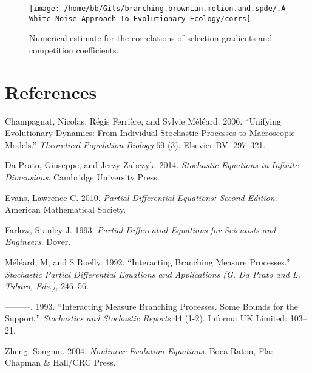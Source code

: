 \documentclass[]{article}
\begin{document}
\begin{figure}[H]

{\centering \texttt{[image: /home/bb/Gits/branching.brownian.motion.and.spde/.A White Noise Approach To Evolutionary Ecology/corrs]} 

}

\caption{\label{num_corr} Numerical estimate for the correlations of selection gradients and competition coefficients.}\label{fig:unnamed-chunk-1}
\end{figure}

\hypertarget{references}{%
\section*{References}\label{references}}

\hypertarget{refs}{}
\leavevmode\hypertarget{ref-Champagnat2006}{}%
Champagnat, Nicolas, Régis Ferrière, and Sylvie Méléard. 2006.
``Unifying Evolutionary Dynamics: From Individual Stochastic Processes
to Macroscopic Models.'' \emph{Theoretical Population Biology} 69 (3).
Elsevier BV: 297--321.

\leavevmode\hypertarget{ref-DaPrato2014}{}%
Da Prato, Giuseppe, and Jerzy Zabczyk. 2014. \emph{Stochastic Equations
in Infinite Dimensions}. Cambridge University Press.

\leavevmode\hypertarget{ref-lawrenceevans2010}{}%
Evans, Lawrence C. 2010. \emph{Partial Differential Equations: Second
Edition}. American Mathematical Society.

\leavevmode\hypertarget{ref-stanleyfarlow1993}{}%
Farlow, Stanley J. 1993. \emph{Partial Differential Equations for
Scientists and Engineers}. Dover.

\leavevmode\hypertarget{ref-meleard1992interacting}{}%
Méléard, M, and S Roelly. 1992. ``Interacting Branching Measure
Processes.'' \emph{Stochastic Partial Differential Equations and
Applications (G. Da Prato and L. Tubaro, Eds.)}, 246--56.

\leavevmode\hypertarget{ref-Mlard1993}{}%
---------. 1993. ``Interacting Measure Branching Processes. Some Bounds
for the Support.'' \emph{Stochastics and Stochastic Reports} 44 (1-2).
Informa UK Limited: 103--21.

\leavevmode\hypertarget{ref-zheng2004nonlinear}{}%
Zheng, Songmu. 2004. \emph{Nonlinear Evolution Equations}. Boca Raton,
Fla: Chapman \& Hall/CRC Press.
\end{document}
